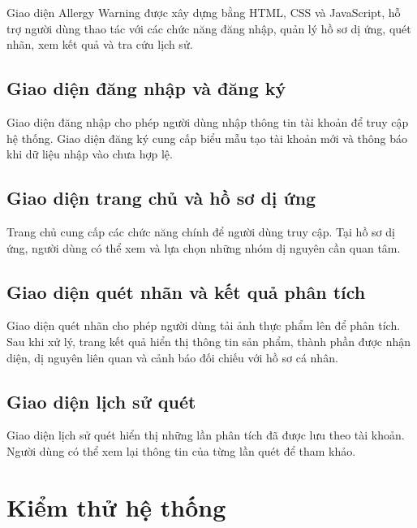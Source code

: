 Giao diện Allergy Warning được xây dựng bằng HTML, CSS và JavaScript, hỗ trợ người dùng thao tác với các chức năng đăng nhập, quản lý hồ sơ dị ứng, quét nhãn, xem kết quả và tra cứu lịch sử.

\subsection{Giao diện đăng nhập và đăng ký}

Giao diện đăng nhập cho phép người dùng nhập thông tin tài khoản để truy cập hệ thống. Giao diện đăng ký cung cấp biểu mẫu tạo tài khoản mới và thông báo khi dữ liệu nhập vào chưa hợp lệ.


\subsection{Giao diện trang chủ và hồ sơ dị ứng}

Trang chủ cung cấp các chức năng chính để người dùng truy cập. Tại hồ sơ dị ứng, người dùng có thể xem và lựa chọn những nhóm dị nguyên cần quan tâm.


\subsection{Giao diện quét nhãn và kết quả phân tích}

Giao diện quét nhãn cho phép người dùng tải ảnh thực phẩm lên để phân tích. Sau khi xử lý, trang kết quả hiển thị thông tin sản phẩm, thành phần được nhận diện, dị nguyên liên quan và cảnh báo đối chiếu với hồ sơ cá nhân.


\subsection{Giao diện lịch sử quét}

Giao diện lịch sử quét hiển thị những lần phân tích đã được lưu theo tài khoản. Người dùng có thể xem lại thông tin của từng lần quét để tham khảo.


\section{Kiểm thử hệ thống}

